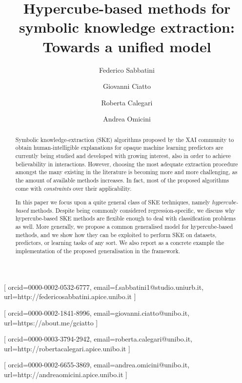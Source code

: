 \documentclass[
]{ceurart}
\begin{document}


\title{Hypercube-based methods for symbolic knowledge extraction: Towards a unified model}

\author[1]{Federico Sabbatini}[%
orcid=0000-0002-0532-6777,
email=f.sabbatini1@studio.uniurb.it,
url=http://federicosabbatini.apice.unibo.it
]\cormark[1]
\address[1]{Dipartimento di Scienze Pure e Applicate (DiSPeA), Universit\`a di Urbino, Italy}

\author[2]{Giovanni Ciatto}[%
orcid=0000-0002-1841-8996,
email=giovanni.ciatto@unibo.it,
url=https://about.me/gciatto
]
\address[2]{Dipartimento di Informatica -- Scienza e Ingegneria (DISI), \textsc{Alma Mater Studiorum}---Universit\`a di Bologna, Italy}

\author[3]{Roberta Calegari}[%
orcid=0000-0003-3794-2942,
email=roberta.calegari@unibo.it,
url=http://robertacalegari.apice.unibo.it
]
\address[3]{Alma Mater Research Institute for Human-Centered Artificial Intelligence, \textsc{Alma Mater Studiorum}---Universit\`a di Bologna, Italy}

\author[2]{Andrea Omicini}[%
orcid=0000-0002-6655-3869,
email=andrea.omicini@unibo.it,
url=http://andreaomicini.apice.unibo.it
]


\begin{abstract}
Symbolic knowledge-extraction (SKE) algorithms proposed by the XAI community to obtain human-intelligible explanations for opaque machine learning predictors are currently being studied and developed with growing interest, also in order to achieve believability in interactions.
%
However, choosing the most adequate extraction procedure amongst the many existing in the literature is becoming more and more challenging, as the amount of available methods increases.
%
In fact, most of the proposed algorithms come with \emph{constraints} over their applicability.

In this paper we focus upon a quite general class of SKE techniques, namely \emph{hypercube-based} methods.
%
Despite being commonly considered regression-specific, we discuss why hypercube-based SKE methods are flexible enough to deal with classification problems as well.
%
More generally, we propose a common generalised model for hypercube-based methods, and we show how they can be exploited to perform SKE on datasets, predictors, or learning tasks of any sort.
%
%
We also report as a concrete example the implementation of the proposed generalisation in the \psyke{} framework.
\end{abstract}
\end{document}
